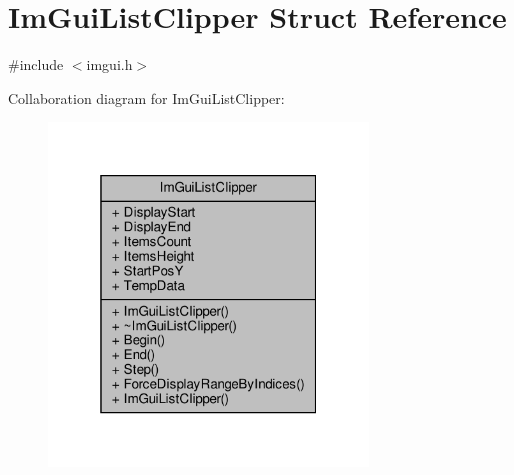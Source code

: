 \hypertarget{structImGuiListClipper}{}\section{Im\+Gui\+List\+Clipper Struct Reference}
\label{structImGuiListClipper}


{\ttfamily \#include $<$imgui.\+h$>$}



Collaboration diagram for Im\+Gui\+List\+Clipper\+:
\nopagebreak
\begin{figure}[H]
\begin{center}
\leavevmode
\includegraphics[width=241pt]{structImGuiListClipper__coll__graph}
\end{center}
\end{figure}
